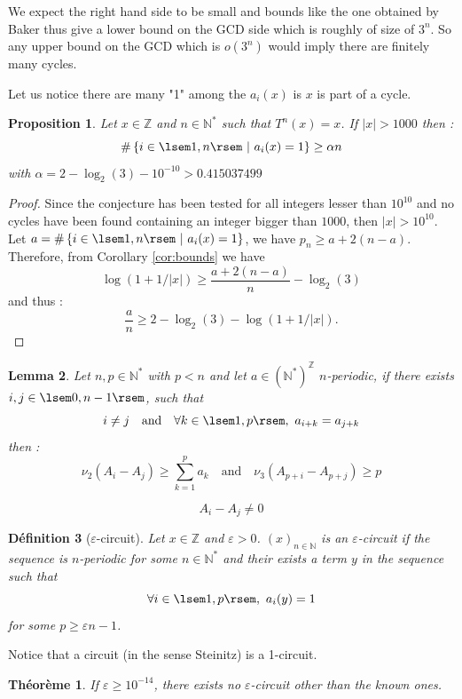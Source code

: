 \documentclass[12pt,a4paper]{article}
\newtheorem{lem}{Lemma}[section]
\newtheorem{prop}[lem]{Proposition}
\newtheorem{defi}[lem]{Définition}
\newtheorem{theo}{Théorème}
\def\NN{\mathbb{N}}
\def\ZZ{\mathbb{Z}}
\begin{document}
We expect the right hand side to be small and bounds like the one obtained by Baker thus give a lower bound on the GCD side which is roughly of size of $3^n$. So any upper bound on the GCD which is $o(3^n)$ would imply there are finitely many cycles. 

Let us notice there are many "1" among the $a_i(x)$ is $x$ is part of a cycle. 

\begin{prop} Let $x\in \ZZ$  and $n\in \NN^*$ such that $T^n(x)=x$. 
If $|x|>1000$ then : 
$$ \#\left\{i\in \lsem 1,n\rsem ~|~ a_i(x) =1\right\} \geq \alpha n $$
with $\alpha = 2-\log_2(3)-10^{-10}> 0.415037499$

\end{prop}
\begin{proof}
Since the conjecture has been tested for all integers lesser than $10^{10}$ and no cycles have been found containing an integer bigger than $1000$, then $|x|>10^{10}$. Let $a=\#\left\{i\in \lsem 1,n\rsem  ~|~ a_i(x) =1\right\} $, we have $p_n\geq a+2(n-a)$. Therefore, from Corollary \ref{cor:bounds} we  have 
$$ \log(1+1/|x|) \geq \frac{a+2(n-a)}{n} - \log_2(3)$$
and thus :
$$ \frac{a}{n} \geq 2-\log_2(3)-\log(1+1/|x|). $$

\end{proof}
\begin{lem} Let $n,p\in\NN^*$ with $p< n$ and let $a \in (\NN^*)^\ZZ$ $n$-periodic, if there exists $i,j\in \lsem 0,n-1\rsem$, such that $$i\neq j\quad \text{and}\quad \forall k\in\lsem 1,p\rsem,~  a_{i+k}=a_{j+k} $$
then :
$$ \nu_2(A_i-A_j)\geq \sum_{k=1}^p a_k \quad \text{and}\quad  \nu_3(A_{p+i}-A_{p+j})\geq p  $$

$$A_i- A_j \neq 0 $$
\end{lem}
\begin{defi}[$\varepsilon$-circuit] Let $x\in \ZZ$ and $\varepsilon>0$. $\left(x\right)_{n\in\NN}$ is an $\varepsilon$-circuit if the sequence is $n$-periodic for some 
$n\in\NN^*$ and their exists a term $y$ in the sequence such that $$\forall i \in \lsem
 1,p\rsem,~a_i(y)=1$$
for some $p\geq \varepsilon n-1$.
\end{defi}
Notice that a circuit (in the sense Steinitz) is a 1-circuit.
\begin{theo} If $\varepsilon\geq 10^{-14}$, there exists no $\varepsilon$-circuit other than the known ones.
\end{theo}
\end{document}
